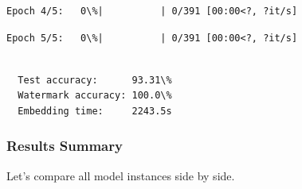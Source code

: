 \documentclass[11pt]{article}
\begin{document}
    
    
    \begin{Verbatim}[commandchars=\\\{\}]
Epoch 4/5:   0\%|          | 0/391 [00:00<?, ?it/s]
    \end{Verbatim}

    
    
    \begin{Verbatim}[commandchars=\\\{\}]
Epoch 5/5:   0\%|          | 0/391 [00:00<?, ?it/s]
    \end{Verbatim}

    
    \begin{Verbatim}[commandchars=\\\{\}]

  Test accuracy:      93.31\%
  Watermark accuracy: 100.0\%
  Embedding time:     2243.5s
    \end{Verbatim}

    \subsubsection{Results Summary}\label{results-summary}

Let's compare all model instances side by side.
\end{document}

